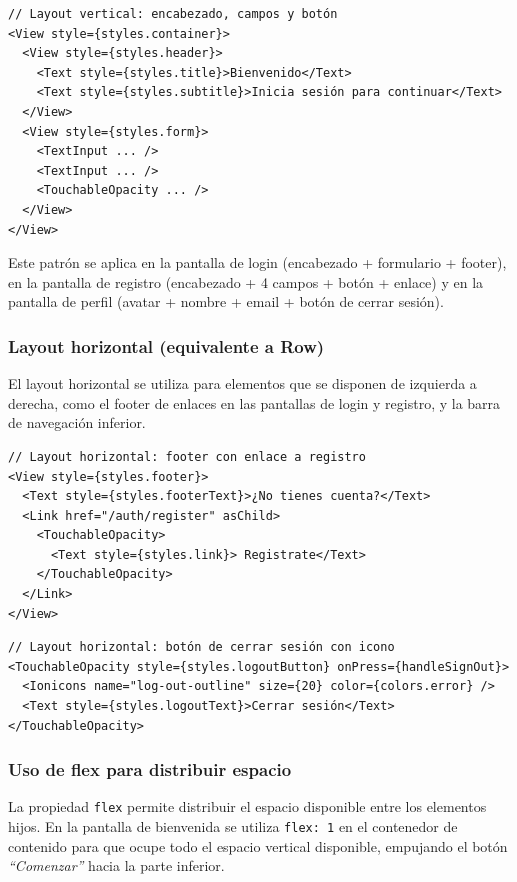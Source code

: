 \begin{lstlisting}
// Layout vertical: encabezado, campos y botón
<View style={styles.container}>
  <View style={styles.header}>
    <Text style={styles.title}>Bienvenido</Text>
    <Text style={styles.subtitle}>Inicia sesión para continuar</Text>
  </View>
  <View style={styles.form}>
    <TextInput ... />
    <TextInput ... />
    <TouchableOpacity ... />
  </View>
</View>
\end{lstlisting}

Este patr\'on se aplica en la pantalla de login (encabezado + formulario +
footer), en la pantalla de registro (encabezado + 4 campos + bot\'on + enlace)
y en la pantalla de perfil (avatar + nombre + email + bot\'on de cerrar sesi\'on).

\subsubsection{Layout horizontal (equivalente a Row)}

El layout horizontal se utiliza para elementos que se disponen de izquierda a
derecha, como el footer de enlaces en las pantallas de login y registro, y la
barra de navegaci\'on inferior.

\begin{lstlisting}
// Layout horizontal: footer con enlace a registro
<View style={styles.footer}>
  <Text style={styles.footerText}>¿No tienes cuenta?</Text>
  <Link href="/auth/register" asChild>
    <TouchableOpacity>
      <Text style={styles.link}> Registrate</Text>
    </TouchableOpacity>
  </Link>
</View>
\end{lstlisting}

\begin{lstlisting}
// Layout horizontal: botón de cerrar sesión con icono
<TouchableOpacity style={styles.logoutButton} onPress={handleSignOut}>
  <Ionicons name="log-out-outline" size={20} color={colors.error} />
  <Text style={styles.logoutText}>Cerrar sesión</Text>
</TouchableOpacity>
\end{lstlisting}

\subsubsection{Uso de flex para distribuir espacio}

La propiedad \texttt{flex} permite distribuir el espacio disponible entre los
elementos hijos. En la pantalla de bienvenida se utiliza \texttt{flex: 1} en
el contenedor de contenido para que ocupe todo el espacio vertical disponible,
empujando el bot\'on \textit{``Comenzar''} hacia la parte inferior.

